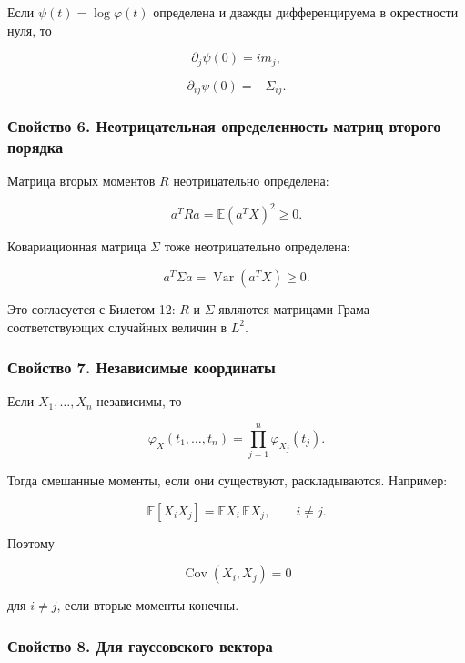 \documentclass[
  11pt,
  a4paper,
]{article}
\begin{document}
Если \(\psi(t)=\log\varphi(t)\) определена и дважды дифференцируема в
окрестности нуля, то

\[
\partial_j\psi(0)=im_j,
\]

\[
\partial_{ij}\psi(0)=-\Sigma_{ij}.
\]

\subsubsection{Свойство 6. Неотрицательная определенность матриц второго
порядка}\label{ux441ux432ux43eux439ux441ux442ux432ux43e-6.-ux43dux435ux43eux442ux440ux438ux446ux430ux442ux435ux43bux44cux43dux430ux44f-ux43eux43fux440ux435ux434ux435ux43bux435ux43dux43dux43eux441ux442ux44c-ux43cux430ux442ux440ux438ux446-ux432ux442ux43eux440ux43eux433ux43e-ux43fux43eux440ux44fux434ux43aux430}

Матрица вторых моментов \(R\) неотрицательно определена:

\[
a^TRa
=
\mathbb E(a^TX)^2
\ge0.
\]

Ковариационная матрица \(\Sigma\) тоже неотрицательно определена:

\[
a^T\Sigma a
=
\operatorname{Var}(a^TX)
\ge0.
\]

Это согласуется с Билетом 12: \(R\) и \(\Sigma\) являются матрицами
Грама соответствующих случайных величин в \(L^2\).

\subsubsection{Свойство 7. Независимые
координаты}\label{ux441ux432ux43eux439ux441ux442ux432ux43e-7.-ux43dux435ux437ux430ux432ux438ux441ux438ux43cux44bux435-ux43aux43eux43eux440ux434ux438ux43dux430ux442ux44b}

Если \(X_1,\ldots,X_n\) независимы, то

\[
\varphi_X(t_1,\ldots,t_n)
=
\prod_{j=1}^n\varphi_{X_j}(t_j).
\]

Тогда смешанные моменты, если они существуют, раскладываются. Например:

\[
\mathbb E[X_iX_j]=\mathbb EX_i\,\mathbb EX_j,
\qquad i\ne j.
\]

Поэтому

\[
\operatorname{Cov}(X_i,X_j)=0
\]

для \(i\ne j\), если вторые моменты конечны.

\subsubsection{Свойство 8. Для гауссовского
вектора}\label{ux441ux432ux43eux439ux441ux442ux432ux43e-8.-ux434ux43bux44f-ux433ux430ux443ux441ux441ux43eux432ux441ux43aux43eux433ux43e-ux432ux435ux43aux442ux43eux440ux430}
\end{document}
